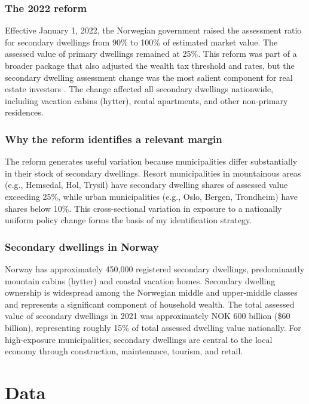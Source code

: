 \documentclass[12pt]{article}
\begin{document}
\subsubsection*{The 2022 reform} Effective January 1, 2022, the Norwegian government raised the assessment ratio for secondary dwellings from 90\% to 100\% of estimated market value. The assessed value of primary dwellings remained at 25\%. This reform was part of a broader package that also adjusted the wealth tax threshold and rates, but the secondary dwelling assessment change was the most salient component for real estate investors \citep{norwegian_tax_commission2022}. The change affected all secondary dwellings nationwide, including vacation cabins (hytter), rental apartments, and other non-primary residences.

\subsubsection*{Why the reform identifies a relevant margin} The reform generates useful variation because municipalities differ substantially in their stock of secondary dwellings. Resort municipalities in mountainous areas (e.g., Hemsedal, Hol, Trysil) have secondary dwelling shares of assessed value exceeding 25\%, while urban municipalities (e.g., Oslo, Bergen, Trondheim) have shares below 10\%. This cross-sectional variation in exposure to a nationally uniform policy change forms the basis of my identification strategy.

\subsubsection*{Secondary dwellings in Norway} Norway has approximately 450,000 registered secondary dwellings, predominantly mountain cabins (hytter) and coastal vacation homes. Secondary dwelling ownership is widespread among the Norwegian middle and upper-middle classes and represents a significant component of household wealth. The total assessed value of secondary dwellings in 2021 was approximately NOK 600 billion (\$60 billion), representing roughly 15\% of total assessed dwelling value nationally. For high-exposure municipalities, secondary dwellings are central to the local economy through construction, maintenance, tourism, and retail.

\section{Data}
\end{document}
